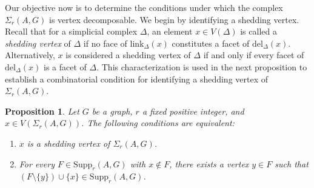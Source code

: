 \documentclass[12pt,reqno]{amsart}
\newtheorem{proposition}{Proposition}[section]
\theoremstyle{definition}
\newcommand{\del}{{\mathrm{del}}}
\newcommand{\Supp}{\mathrm{Supp}}
\def\link{\mathrm{link}}
\def\del{\mathrm{del}}
\begin{document}
\medskip
Our objective now is to determine the conditions under which the complex $\Sigma_r(A,G)$ is vertex decomposable. 
We begin by identifying a shedding vertex. 
Recall that for a simplicial complex $\Delta$, an element $x\in V(\Delta)$ is called a {\it shedding vertex} of $\Delta$ if no face of $\link_{\Delta}(x)$ constitutes a facet of $\del_{\Delta}(x)$. 
Alternatively, $x$ is considered a shedding vertex of $\Delta$ if and only if every facet of $\del_{\Delta}(x)$ is a facet of $\Delta$. 
This characterization is used in the next proposition to establish a combinatorial condition for identifying a shedding vertex of $\Sigma_r(A,G)$.
	
\begin{proposition}\label{Eq. Condition for a shedding vertex}
Let $G$ be a graph, $r$ a fixed positive integer, and $x \in V(\Sigma_r(A,G))$. The following conditions are equivalent:
\begin{enumerate}
	\item[(i)] $x$ is a shedding vertex of $\Sigma_r(A,G)$.		
	\item[(ii)] For every $F \in \Supp_r(A,G)$ with $x \notin F$, there exists a vertex $y \in F$ such that $(F \setminus \{y\}) \cup \{x\} \in \mathrm{Supp}_r(A,G)$.
\end{enumerate}
\end{proposition}
\end{document}
